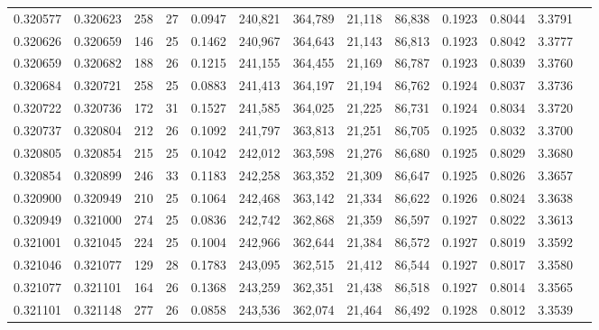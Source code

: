 \begin{tabular}{rrrrrrrrrrrrr}
0.320577 & 0.320623 &   258 &  27 &                                     0.0947 & 240,821 & 364,789 &  21,118 &  86,838 & 0.1923 & 0.8044 & 3.3791 \\
0.320626 & 0.320659 &   146 &  25 &                                     0.1462 & 240,967 & 364,643 &  21,143 &  86,813 & 0.1923 & 0.8042 & 3.3777 \\
0.320659 & 0.320682 &   188 &  26 &                                     0.1215 & 241,155 & 364,455 &  21,169 &  86,787 & 0.1923 & 0.8039 & 3.3760 \\
0.320684 & 0.320721 &   258 &  25 &                                     0.0883 & 241,413 & 364,197 &  21,194 &  86,762 & 0.1924 & 0.8037 & 3.3736 \\
0.320722 & 0.320736 &   172 &  31 &                                     0.1527 & 241,585 & 364,025 &  21,225 &  86,731 & 0.1924 & 0.8034 & 3.3720 \\
0.320737 & 0.320804 &   212 &  26 &                                     0.1092 & 241,797 & 363,813 &  21,251 &  86,705 & 0.1925 & 0.8032 & 3.3700 \\
0.320805 & 0.320854 &   215 &  25 &                                     0.1042 & 242,012 & 363,598 &  21,276 &  86,680 & 0.1925 & 0.8029 & 3.3680 \\
0.320854 & 0.320899 &   246 &  33 &                                     0.1183 & 242,258 & 363,352 &  21,309 &  86,647 & 0.1925 & 0.8026 & 3.3657 \\
0.320900 & 0.320949 &   210 &  25 &                                     0.1064 & 242,468 & 363,142 &  21,334 &  86,622 & 0.1926 & 0.8024 & 3.3638 \\
0.320949 & 0.321000 &   274 &  25 &                                     0.0836 & 242,742 & 362,868 &  21,359 &  86,597 & 0.1927 & 0.8022 & 3.3613 \\
0.321001 & 0.321045 &   224 &  25 &                                     0.1004 & 242,966 & 362,644 &  21,384 &  86,572 & 0.1927 & 0.8019 & 3.3592 \\
0.321046 & 0.321077 &   129 &  28 &                                     0.1783 & 243,095 & 362,515 &  21,412 &  86,544 & 0.1927 & 0.8017 & 3.3580 \\
0.321077 & 0.321101 &   164 &  26 &                                     0.1368 & 243,259 & 362,351 &  21,438 &  86,518 & 0.1927 & 0.8014 & 3.3565 \\
0.321101 & 0.321148 &   277 &  26 &                                     0.0858 & 243,536 & 362,074 &  21,464 &  86,492 & 0.1928 & 0.8012 & 3.3539 \\

\end{tabular}
